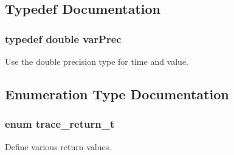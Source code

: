 \subsection{Typedef Documentation}
\hypertarget{group__type_gabda13d5bcd0cbdb094d655181a857e25}{
\subsubsection[{var\-Prec}]{\setlength{\rightskip}{0pt plus 5cm}typedef double {\bf var\-Prec}}}\label{group__type_gabda13d5bcd0cbdb094d655181a857e25}


Use the double precision type for time and value. 



\subsection{Enumeration Type Documentation}
\hypertarget{group__type_ga1f1b68fb37d7331f03a48ef0993a0788}{
\subsubsection[{trace\-\_\-return\-\_\-t}]{\setlength{\rightskip}{0pt plus 5cm}enum {\bf trace\-\_\-return\-\_\-t}}}\label{group__type_ga1f1b68fb37d7331f03a48ef0993a0788}


Define various return values. 


